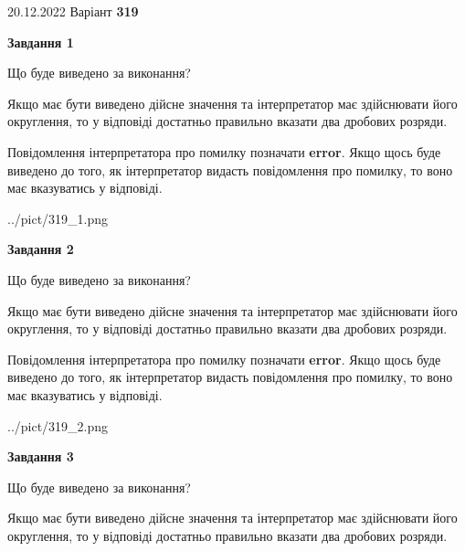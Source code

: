 \documentclass[12pt, ukrainian]{article}
\begin{document}
{20.12.2022 Варіант \No \textbf { 319 }\par}
{
\begin {Large}

{\begin {center}\textbf{Завдання 1}\end {center}}\par
Що буде виведено за виконання? \par

Якщо має бути виведено дійсне значення та інтерпретатор має здійснювати його округлення, 
то у відповіді достатньо правильно вказати два дробових розряди.

Повідомлення інтерпретатора про помилку позначати \textbf{error}.
Якщо щось буде виведено до того, як інтерпретатор видасть повідомлення про помилку, 
то воно має вказуватись у відповіді. \par

\begin{center}
	{../pict/319_1.png}
\end{center}
\newpage

{\begin {center}\textbf{Завдання 2}\end {center}}\par
Що буде виведено за виконання? \par

Якщо має бути виведено дійсне значення та інтерпретатор має здійснювати його округлення, 
то у відповіді достатньо правильно вказати два дробових розряди.

Повідомлення інтерпретатора про помилку позначати \textbf{error}.
Якщо щось буде виведено до того, як інтерпретатор видасть повідомлення про помилку, 
то воно має вказуватись у відповіді. \par

\begin{center}
	{../pict/319_2.png}
\end{center}
\newpage

{\begin {center}\textbf{Завдання 3}\end {center}}\par
Що буде виведено за виконання? \par

Якщо має бути виведено дійсне значення та інтерпретатор має здійснювати його округлення, 
то у відповіді достатньо правильно вказати два дробових розряди.


\end{Large}}
\end{document}
